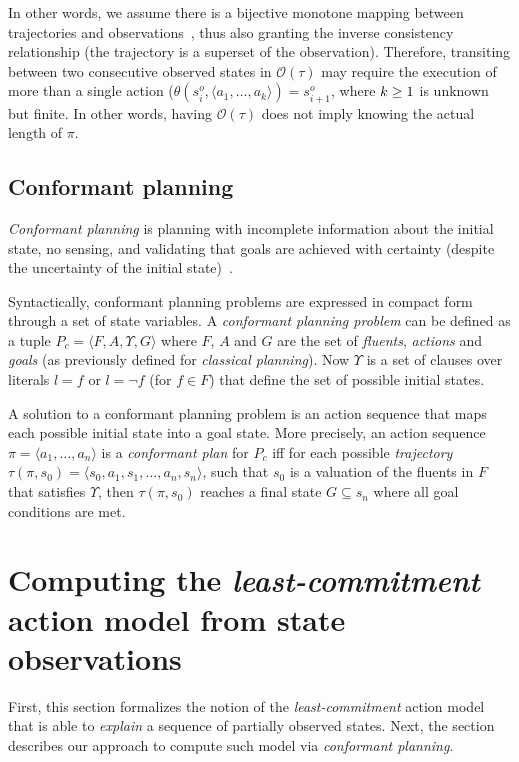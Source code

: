 \documentclass{article}
\newcommand{\tup}[1]{{\langle #1 \rangle}}
\begin{document}
In other words, we assume there is a bijective monotone mapping between trajectories and observations~\cite{ramirez2009plan}, thus also granting the inverse consistency relationship (the trajectory is a superset of the observation). Therefore, transiting between two consecutive observed states in $\mathcal{O}(\tau)$ may require the execution of more than a single action ($\theta(s_i^o,\tup{a_1,\ldots,a_k})=s_{i+1}^o$, where ${\small k\geq 1}$ is unknown but finite. In other words, having $\mathcal{O}(\tau)$ does not imply knowing the actual length of $\pi$.

\subsection{Conformant planning}
{\em Conformant planning} is planning with incomplete information about the initial state, no sensing, and validating that goals are achieved with certainty (despite the uncertainty of the initial state)~\cite{smith1998conformant,goldman1996expressive}.

Syntactically, conformant planning problems are expressed in compact form through a set of state variables. A {\em conformant planning problem} can be defined as a tuple $P_c=\tup{F,A,\Upsilon,G}$ where $F$, $A$ and $G$ are the set of {\em fluents}, {\em actions} and {\em goals} (as previously defined for {\em classical planning}). Now $\Upsilon$ is a set of clauses over literals $l=f$ or $l=\neg f$ (for $f\in F$) that define the set of possible initial states. 

A solution to a conformant planning problem is an action sequence that maps each possible initial state into a goal state. More precisely, an action sequence $\pi=\tup{a_1, \ldots, a_n}$ is a {\em conformant plan} for $P_c$ iff for each possible {\em trajectory} $\tau(\pi,s_0)=\tup{s_0, a_1, s_1, \ldots, a_n, s_n}$, such that $s_0$ is a valuation of the fluents in $F$ that satisfies $\Upsilon$, then $\tau(\pi,s_0)$ reaches a final state $G \subseteq s_n$ where all goal conditions are met.



\section{Computing the {\em least-commitment} action model from state observations}
First, this section formalizes the notion of the {\em least-commitment} action model that is able to {\em explain} a sequence of partially observed states. Next, the section describes our approach to compute such model via {\em conformant planning}. 
\end{document}

